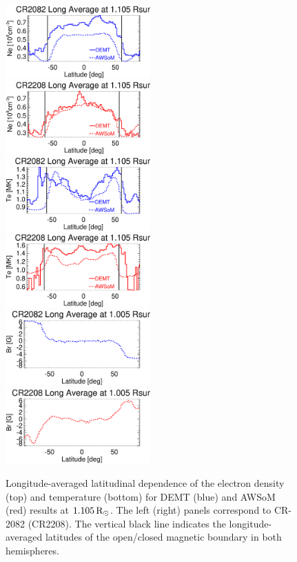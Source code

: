 \documentclass[namedreferences]{solarphysics}
\newcommand{\mrsun}{{\rm R_\odot}}
\begin{document}
\begin{article}
\begin{figure}[h!]
\begin{center}
\includegraphics[width=0.495\textwidth]{figs/Perfil_Ne_demt_awsom_2082_1105.eps}
\includegraphics[width=0.495\textwidth]{figs/Perfil_Ne_demt_awsom_2208_1105.eps}
\includegraphics[width=0.495\textwidth]{figs/Perfil_Te_demt_awsom_2082_1105.eps}
\includegraphics[width=0.495\textwidth]{figs/Perfil_Te_demt_awsom_2208_1105.eps}
\includegraphics[width=0.495\textwidth]{figs/Perfil_Br_2082_1005.eps}
\includegraphics[width=0.495\textwidth]{figs/Perfil_Br_2208_1005.eps}
\caption{Longitude-averaged latitudinal dependence of the electron density (top) and temperature (bottom) for DEMT (blue) and AWSoM (red) results at $1.105\,\mrsun$. The left (right) panels correspond to CR-2082 (CR2208). The vertical black line indicates the longitude-averaged latitudes of the open/closed magnetic boundary in both hemispheres.}
\label{perf_lat}
\end{center}
\end{figure}


\end{article}
\end{document}
